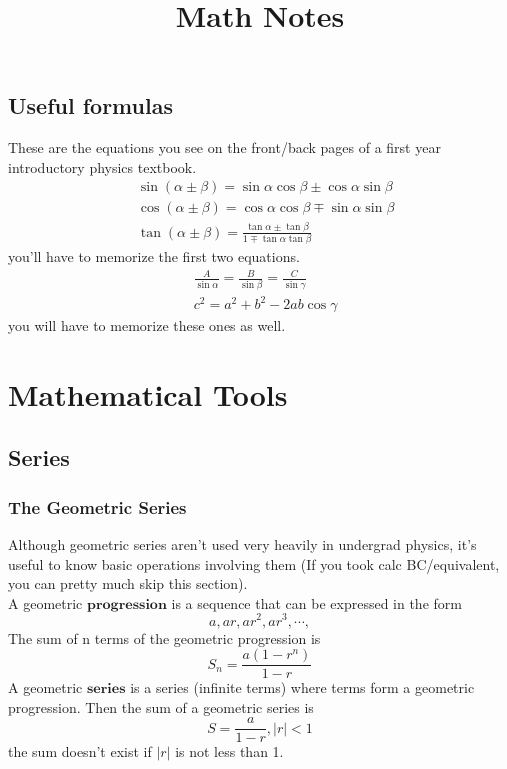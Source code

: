 \documentclass[oneside]{book}
\title{Math Notes}
\numberwithin{equation}{chapter} %
\begin{document}
\maketitle
\tableofcontents
\clearpage

\chapter*{Useful formulas}
These are the equations you see on the front/back pages of a first year introductory physics textbook. 
\begin{align*}
	&\sin(\alpha\pm\beta)=\sin\alpha\cos\beta\pm\cos\alpha\sin\beta\\
	&\cos(\alpha\pm\beta)=\cos\alpha\cos\beta\mp\sin\alpha\sin\beta\\
	&\tan(\alpha\pm\beta)=\frac{\tan\alpha\pm\tan\beta}{1\mp\tan\alpha\tan\beta}
\end{align*}
you'll have to memorize the first two equations. 
\begin{align*}
	&\frac{A}{\sin\alpha}=\frac{B}{\sin\beta}=\frac{C}{\sin\gamma}\\
	&c^2=a^2+b^2-2ab\cos\gamma
\end{align*}
you will have to memorize these ones as well. 
\clearpage
\part{Mathematical Tools}
\chapter{Series}
\section{The Geometric Series}


Although geometric series aren't used very heavily in undergrad physics, it's useful to know basic operations involving them (If you took calc BC/equivalent, you can pretty much skip this section). \\
A geometric $\textbf{progression}$ is a sequence that can be expressed in the form 
$$a,ar,ar^2,ar^3,\cdots,$$
The sum of n terms of the geometric progression is 
\begin{equation}
	\boxed{S_n=\frac{a(1-r^n)}{1-r}}
\end{equation}
A geometric $\textbf{series}$ is a series (infinite terms) where terms form a geometric progression. Then the sum of a geometric series is 
\begin{equation}
	\boxed{S=\frac{a}{1-r}, |r|<1}
\end{equation}
the sum doesn't exist if $|r|$ is not less than 1.
\end{document}
